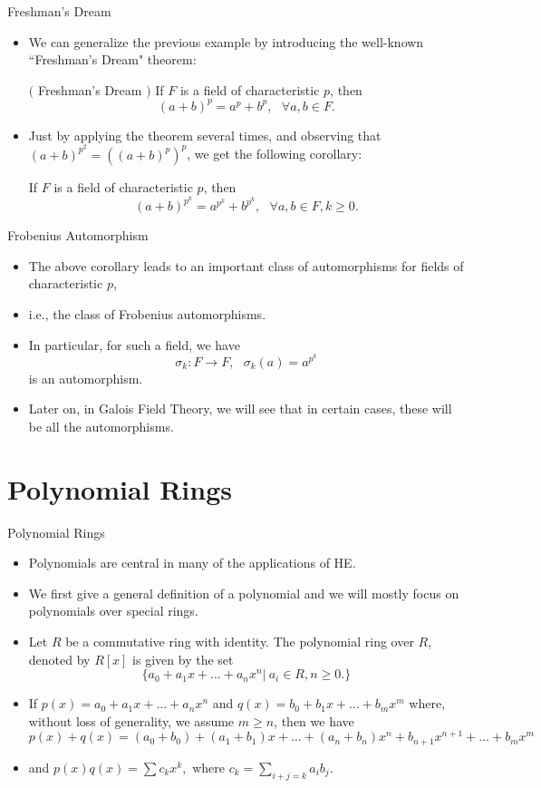 \documentclass[ %
 10pt, xcolor={dvipsnames,svgnames,x11names,hyperref},
   hyperref={colorlinks=true,citecolor=green,linkcolor=DarkRed,urlcolor=ProcessBlue,anchorcolor=blue}
  ]{beamer}
\newenvironment{stepitemize}{\begin{itemize}[<+->]}{\end{itemize} }
\begin{document}
\begin{frame}{Freshman's Dream}
\begin{stepitemize}
    \item We can generalize the previous example by introducing the well-known ``Freshman's Dream" theorem:
\begin{theorem}$($ Freshman's Dream $)$
If $F$ is a field of characteristic $p$, then
$$(a+b)^p = a^p+b^p,  \:\:\:\forall a,b \in F.$$
\end{theorem}
\item Just by applying the theorem several times, and observing that $(a+b)^{p^2} = ((a+b)^p)^p$, we get the following corollary:
\begin{corollary}
If $F$ is a field of characteristic $p$, then
$$(a+b)^{p^k}= a^{p^k}+b^{p^k},  \:\:\:\forall a,b \in F, k\geq 0.$$
\end{corollary}
\end{stepitemize}
\end{frame}

\begin{frame}{Frobenius Automorphism}
    \begin{stepitemize}
    \item The above corollary leads to an important class of automorphisms for fields of characteristic $p$,
    \item i.e., the class of Frobenius automorphisms.
    \item In particular, for such a field, we have
$$\sigma_k:F\rightarrow F, \:\:\:\sigma_k(a)=a^{p^k}$$ is an automorphism.
\item Later on, in Galois Field Theory, we will see that in certain cases, these will be all the automorphisms.
\end{stepitemize}
\end{frame}

\section{Polynomial Rings}
\begin{frame}{Polynomial Rings}
\begin{stepitemize}
\item Polynomials are central in many of the applications of HE.
\item We first give a general definition of a polynomial and we will mostly focus on polynomials over special rings.
\item Let $R$ be a commutative ring with identity. The polynomial ring over $R$, denoted by $R[x]$ is given by the set
$$\{a_0+a_1x+\dots +a_nx^n| \: a_i\in R, n\geq 0.\}$$
\item If $p(x)=a_0+a_1x+\dots +a_nx^n$ and $q(x)=b_0+b_1x+\dots+b_mx^m$ where, without loss of generality, we assume $m\geq n$, then we have
$$p(x)+q(x) = (a_0+b_0)+(a_1+b_1)x+\dots +(a_n+b_n)x^n+b_{n+1}x^{n+1}+\dots +b_mx^m$$
\item and $p(x)q(x) = \sum c_kx^k,$
where $c_k = \sum_{i+j=k}a_ib_j$.
\end{stepitemize}
\end{frame}
\end{document}
